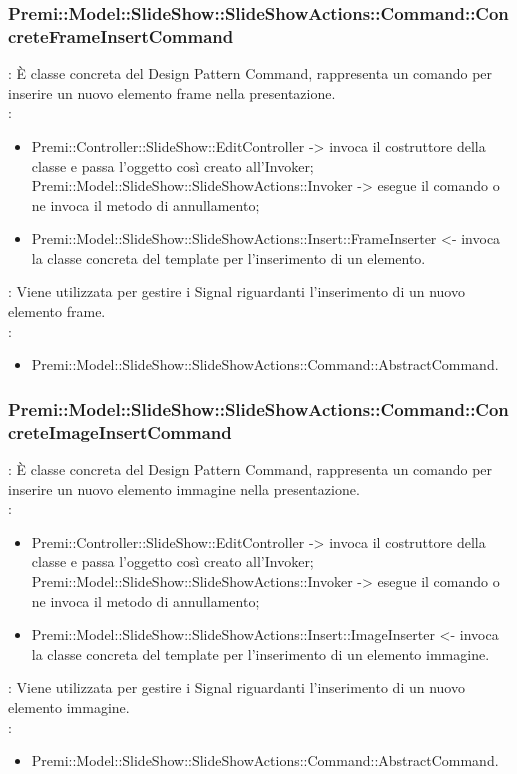 {                    \subsubsection{Premi::Model::SlideShow::SlideShowActions::Command::ConcreteFrameInsertCommand}{
				\textbf{\tipo}: È classe concreta del Design Pattern Command, rappresenta un comando per inserire un nuovo elemento frame nella presentazione.\\	
				\textbf{\relaz}: 
				\begin{itemize}
					\item Premi::Controller::SlideShow::EditController -> invoca il costruttore della classe e passa l’oggetto così creato all’Invoker;
Premi::Model::SlideShow::SlideShowActions::Invoker -> esegue il comando o ne invoca il metodo di annullamento;
                    \item Premi::Model::SlideShow::SlideShowActions::Insert::FrameInserter <- invoca la classe concreta del template per l’inserimento di un elemento.
				\end{itemize}	
                \textbf{\interfacce}: Viene utilizzata per gestire i Signal riguardanti l’inserimento di un nuovo elemento frame.\\
                \textbf{\base}: 
                    \begin{itemize}
                    \item Premi::Model::SlideShow::SlideShowActions::Command::AbstractCommand.
                    \end{itemize}
                    }
                    \subsubsection{Premi::Model::SlideShow::SlideShowActions::Command::ConcreteImageInsertCommand}{
				\textbf{\tipo}: È classe concreta del Design Pattern Command, rappresenta un comando per inserire un nuovo elemento immagine nella presentazione.\\	
				\textbf{\relaz}: 
				\begin{itemize}
					\item Premi::Controller::SlideShow::EditController -> invoca il costruttore della classe e passa l’oggetto così creato all’Invoker;
Premi::Model::SlideShow::SlideShowActions::Invoker -> esegue il comando o ne invoca il metodo di annullamento;
                    \item Premi::Model::SlideShow::SlideShowActions::Insert::ImageInserter <- invoca la classe concreta del template per l’inserimento di un elemento immagine.
				\end{itemize}	
                \textbf{\interfacce}: Viene utilizzata per gestire i Signal riguardanti l’inserimento di un nuovo elemento immagine.\\
                \textbf{\base}: 
                    \begin{itemize}
                    \item Premi::Model::SlideShow::SlideShowActions::Command::AbstractCommand.
                    \end{itemize}
                    }
}
